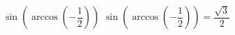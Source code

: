  {$\sin\left(\arccos\left(-\dfrac{1}{2}\right)\right)$ }
{ $\sin\left(\arccos\left(-\dfrac{1}{2}\right)\right) = \dfrac{\sqrt{3}}{2}$}
